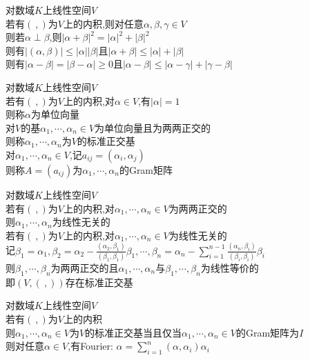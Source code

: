 \begin{dingli}
对数域$K$上线性空间$V$\\
若有$(\ ,)$为$V$上的内积,则对任意$\alpha,\beta,\gamma\in V$\\
则若$\alpha\perp\beta$,则$|\alpha+\beta|^2=|\alpha|^2+|\beta|^2$\\
则有$|(\alpha,\beta)|\leq|\alpha||\beta|$且$|\alpha+\beta|\leq|\alpha|+|\beta|$\\
则有$|\alpha-\beta|=|\beta-\alpha|\geq0$且$|\alpha-\beta|\leq|\alpha-\gamma|+|\gamma-\beta|$
\end{dingli}

\begin{dingyi}
对数域$K$上线性空间$V$\\
若有$(\ ,)$为$V$上的内积,对$\alpha\in V$,有$|\alpha|=1$\\
则称$\alpha$为单位向量\\
对$V$的基$\alpha_1,\cdots,\alpha_n\in V$为单位向量且为两两正交的\\
则称$\alpha_1,\cdots,\alpha_n$为$V$的标准正交基\\
对$\alpha_1,\cdots,\alpha_n\in V$,记$a_{ij}=(\alpha_i,\alpha_j)$\\
则称$A=(a_{ij})$为$\alpha_1,\cdots,\alpha_n$的Gram矩阵
\end{dingyi}

\begin{dingli}
对数域$K$上线性空间$V$\\
若有$(\ ,)$为$V$上的内积,对$\alpha_1,\cdots,\alpha_n\in V$为两两正交的\\
则$\alpha_1,\cdots,\alpha_n$为线性无关的\\
若有$(\ ,)$为$V$上的内积,对$\alpha_1,\cdots,\alpha_n\in V$为线性无关的\\
记$\beta_1=\alpha_1,\beta_2=\alpha_2-\frac{(\alpha_2,\beta_1)}{(\beta_1,\beta_1)}\beta_1,\cdots,\beta_n=\alpha_n-\sum\limits_{i=1}^{n-1}\frac{(\alpha_n,\beta_i)}{(\beta_i,\beta_i)}\beta_i$\\
则$\beta_1,\cdots,\beta_n$为两两正交的且$\alpha_1,\cdots,\alpha_n$与$\beta_1,\cdots,\beta_n$为线性等价的\\
即$(V,(\ ,))$存在标准正交基
\end{dingli}

\begin{dingli}
对数域$K$上线性空间$V$\\
若有$(\ ,)$为$V$上的内积\\
则$\alpha_1,\cdots,\alpha_n\in V$为$V$的标准正交基当且仅当$\alpha_1,\cdots,\alpha_n\in V$的Gram矩阵为$I$\\
则对任意$\alpha\in V$,有Fourier: $\alpha=\sum\limits_{i=1}^{n}(\alpha,\alpha_i)\alpha_i$
\end{dingli}

